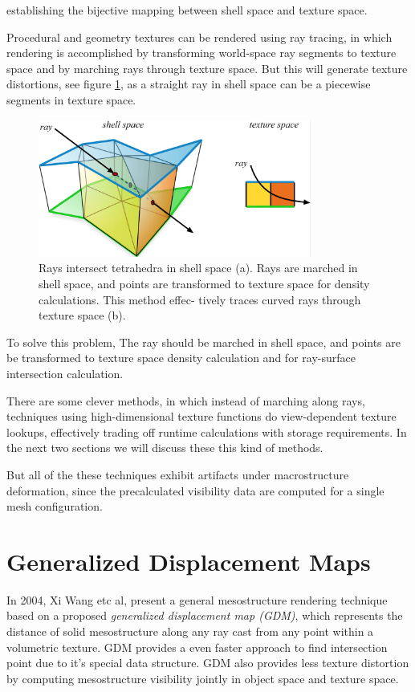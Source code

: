 establishing the bijective mapping between shell space and texture space.

Procedural and geometry textures can be rendered using ray tracing, in which rendering is accomplished by transforming world-space ray segments to texture space and by marching rays through texture space. But this will generate texture distortions, see figure \ref{f:ray-tracing-in-shell-space}, as a straight ray in shell space can be a piecewise segments in texture space. 

\begin{figure}\label{f:ray-tracing-in-shell-space}
	\begin{center}
		\includegraphics[width=0.8\textwidth]{graphics/df/shell-maps-5}	
	\end{center}	
	\caption{Rays intersect tetrahedra in shell space (a). Rays are marched in shell space, and points are transformed to texture space for density calculations. This method effec- tively traces curved rays through texture space (b).}
\end{figure}

To solve this problem, The ray should be marched in shell space, and points are be transformed to texture space density calculation and for ray-surface intersection calculation.

There are some clever methods, in which instead of marching along rays, techniques using high-dimensional texture functions do view-dependent texture lookups, effectively trading off runtime calculations with storage requirements. In the next two sections we will discuss these this kind of methods. 

But all of the these techniques exhibit artifacts under macrostructure deformation, since the precalculated visibility data are computed for a single mesh configuration.


\section{Generalized Displacement Maps}
In 2004, Xi Wang etc al, present a general mesostructure rendering technique\cite[-85mm]{a:GeneralizedDisplacementMaps} based on a proposed \textit{generalized displacement map (GDM)}, which represents the distance of solid mesostructure along any ray cast from any point within a volumetric texture. GDM provides a even faster approach to find intersection point due to it's special data structure. GDM also provides less texture distortion by computing mesostructure visibility jointly in object space and texture space.

